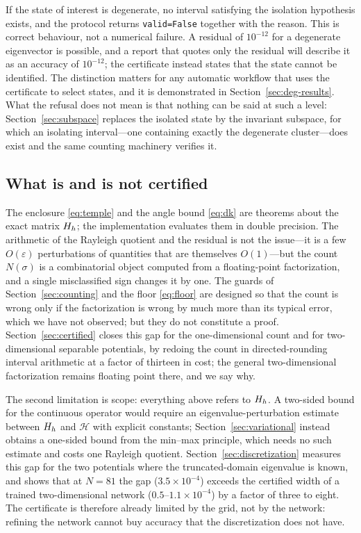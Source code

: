 \begin{remark}
\label{sec:degeneracy}
If the state of interest is degenerate, no interval satisfying the isolation
hypothesis exists, and the protocol returns \texttt{valid=False} together with
the reason. This is correct behaviour, not a numerical failure. A residual of
$10^{-12}$ for a degenerate eigenvector is possible, and a report that quotes
only the residual will describe it as an accuracy of $10^{-12}$; the
certificate instead states that the state cannot be identified. The
distinction matters for any automatic workflow that uses the certificate to
select states, and it is demonstrated in Section~\ref{sec:deg-results}.
What the refusal does not mean is that nothing can be said at such a level: Section~\ref{sec:subspace} replaces the isolated state by the invariant subspace, for which an isolating interval---one containing exactly the degenerate cluster---does exist and the same counting machinery verifies it.
\end{remark}

\subsection{What is and is not certified}
\label{sec:fp}

The enclosure \eqref{eq:temple} and the angle bound \eqref{eq:dk} are
theorems about the exact matrix $H_h$; the implementation evaluates them in
double precision. The arithmetic of the Rayleigh quotient and the residual is
not the issue---it is a few $O(\varepsilon)$ perturbations of quantities that
are themselves $O(1)$---but the count $N(\sigma)$ is a combinatorial object
computed from a floating-point factorization, and a single misclassified sign
changes it by one. The guards of Section~\ref{sec:counting} and the floor
\eqref{eq:floor} are designed so that the count is wrong only if the
factorization is wrong by much more than its typical error, which we have not
observed; but they do not constitute a proof. Section~\ref{sec:certified}
closes this gap for the one-dimensional count and for two-dimensional
separable potentials, by redoing the count in directed-rounding interval
arithmetic at a factor of thirteen in cost; the general two-dimensional
factorization remains floating point there, and we say why.

The second limitation is scope: everything above refers to $H_h$. A
two-sided bound for the continuous operator would require an
eigenvalue-perturbation estimate between $H_h$ and $\mathcal H$ with explicit
constants; Section~\ref{sec:variational} instead obtains a one-sided bound
from the min--max principle, which needs no such estimate and costs one
Rayleigh quotient. Section~\ref{sec:discretization} measures
this gap for the two potentials where the truncated-domain eigenvalue is
known, and shows that at $N=81$ the gap ($3.5\times10^{-4}$) exceeds the certified
width of a trained two-dimensional network ($0.5$--$1.1\times10^{-4}$) by a
factor of three to eight. The certificate is therefore already limited by the
grid, not by the network: refining the network cannot buy accuracy that the
discretization does not have.
